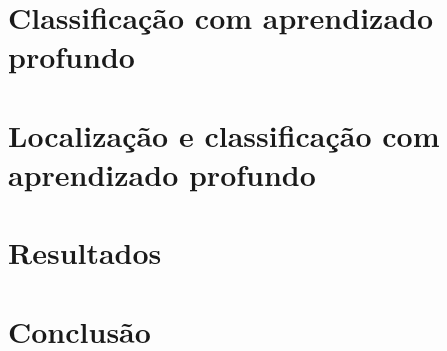\documentclass[a5paper]{ufsc-thesis}  %
\begin{document}
\pretextual%
\imprimircapa%
\imprimirfolhaderosto*%
\clearpage
\imprimirfichacatalografica%
\tableofcontents%
\textual%




\chapter{Classificação com aprendizado profundo}
\chapter{Localização e classificação com aprendizado profundo}
\chapter{Resultados}
\chapter{Conclusão}
\end{document}

